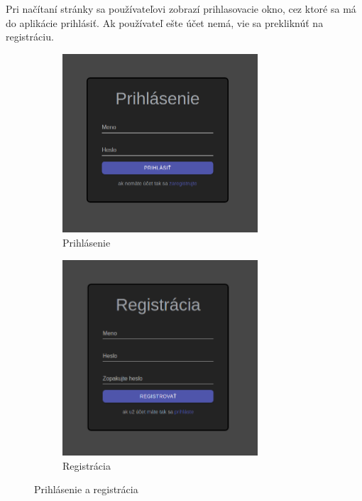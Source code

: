 Pri načítaní stránky sa používateľovi zobrazí prihlasovacie okno, cez ktoré sa má do aplikácie
prihlásiť. Ak používateľ ešte účet nemá, vie sa prekliknúť na registráciu.
\begin{figure}[H]
\centering
\begin{subfigure}{.5\textwidth}
  \centering
  \includegraphics[width=0.8\textwidth]{images/prihlasenie}
  \caption[Prihlásenie]{Prihlásenie}
  \label{obr:prihlasenie}
\end{subfigure}%
\begin{subfigure}{.5\textwidth}
  \centering
  \includegraphics[width=0.8\textwidth]{images/registracia}
  \caption[Registrácia]{Registrácia}
  \label{obr:registracia}
\end{subfigure}
\caption{Prihlásenie a registrácia}
\end{figure}

